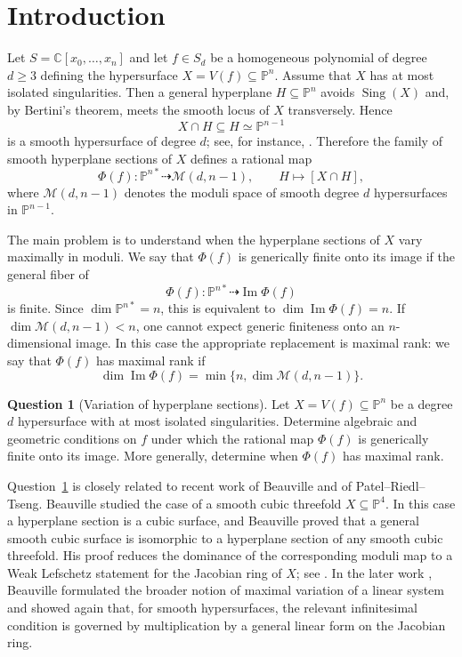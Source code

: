 \documentclass[11pt]{amsart}
\theoremstyle{plain}
\theoremstyle{definition}
\newtheorem{question}[subsection]{Question}
\numberwithin{equation}{section}
\newcommand{\M}{{\mathcal M}}
\newcommand{\C}{\mathbb{C}}
\newcommand{\PP}{\mathbb{P}}
\begin{document}
\maketitle
\section{Introduction}
\label{sec:introduction}
Let $S=\C[x_0,\ldots,x_n]$ and let $f\in S_d$ be a homogeneous polynomial of degree $d\geq 3$ defining the hypersurface $X=V(f)\subseteq \PP^n$. Assume that $X$ has at most isolated singularities. Then a general hyperplane $H\subseteq \PP^n$ avoids $\operatorname{Sing}(X)$ and, by Bertini's theorem, meets the smooth locus of $X$ transversely. Hence
\[
X\cap H\subseteq H\simeq \PP^{n-1}
\]
is a smooth hypersurface of degree $d$; see, for instance, \cite[III, Corollary~10.9]{Har}. Therefore the family of smooth hyperplane sections of $X$ defines a rational map
\begin{equation}
\label{eq:hyperplane-section-map}
\Phi(f):\PP^{n*}\dashrightarrow \M(d,n-1),
\qquad
H\longmapsto [X\cap H],
\end{equation}
where $\M(d,n-1)$ denotes the moduli space of smooth degree $d$ hypersurfaces in $\PP^{n-1}$.

The main problem is to understand when the hyperplane sections of $X$ vary maximally in moduli. We say that $\Phi(f)$ is generically finite onto its image if the general fiber of
\[
\Phi(f):\PP^{n*}\dashrightarrow \operatorname{Im}\Phi(f)
\]
is finite. Since $\dim \PP^{n*}=n$, this is equivalent to $\dim \operatorname{Im}\Phi(f)=n$. If $\dim \M(d,n-1)<n$, one cannot expect generic finiteness onto an $n$-dimensional image. In this case the appropriate replacement is maximal rank: we say that $\Phi(f)$ has maximal rank if
\[
\dim \operatorname{Im}\Phi(f)=\min\{n,\dim \M(d,n-1)\}.
\]

\begin{question}[Variation of hyperplane sections]
\label{q:variation-hyperplane-sections}
Let $X=V(f)\subseteq \PP^n$ be a degree $d$ hypersurface with at most isolated singularities. Determine algebraic and geometric conditions on $f$ under which the rational map $\Phi(f)$ is generically finite onto its image. More generally, determine when $\Phi(f)$ has maximal rank.
\end{question}

Question~\ref{q:variation-hyperplane-sections} is closely related to recent work of Beauville and of Patel--Riedl--Tseng. Beauville studied the case of a smooth cubic threefold $X\subseteq \PP^4$. In this case a hyperplane section is a cubic surface, and Beauville proved that a general smooth cubic surface is isomorphic to a hyperplane section of any smooth cubic threefold. His proof reduces the dominance of the corresponding moduli map to a Weak Lefschetz statement for the Jacobian ring of $X$; see \cite{B}. In the later work \cite{B2}, Beauville formulated the broader notion of maximal variation of a linear system and showed again that, for smooth hypersurfaces, the relevant infinitesimal condition is governed by multiplication by a general linear form on the Jacobian ring.
\end{document}
